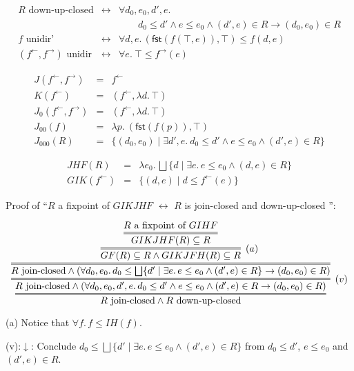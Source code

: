 \documentclass[9pt]{article}
\newcommand{\ff}{{f^{\rightarrow}}}
\newcommand{\fb}{{f^{\leftarrow}}}
\newcommand{\bigjoin}{\bigsqcup}
\newcommand{\con}{\wedge}
\newcommand{\imp}{\to}
\newcommand{\equ}{\leftrightarrow}
\newcommand{\fst}{\mathsf{fst}}
\begin{document}
 

\begin{eqnarray*}
  R \textrm{~down-up-closed}
  & \equ & \forall d_0,e_0,d',e.\, \\
  & & \qquad
        d_0 \leq d' \con e \leq e_0
           \con (d',e) \in R \imp (d_0,e_0) \in R \\
  f \textrm{~unidir'}
  & \equ & \forall d,e.\, (\fst(f(\top,e)),\top) \leq f(d,e) \\
  (\fb,\ff) \textrm{~unidir}
  & \equ & \forall e.\ \top \leq \ff(e)
\end{eqnarray*}           

\begin{eqnarray*}
  J(\fb,\ff)
  & = & \fb \\
  K(\fb)
  & = & (\fb, \lambda d.\, \top) \\  
  J_0(\fb,\ff)
  & = & (\fb, \lambda d.\, \top) \\
  J_{00}(f) 
  & = & \lambda p.\ (\fst(f(p)), \top) \\
  J_{000}(R)
  & = & \{ (d_0,e_0) \mid \exists d',e.\
          d_0 \leq d' \con e \leq e_0 \con (d',e) \in R \}
\end{eqnarray*}

\begin{eqnarray*}
 JHF(R) & = &
    \lambda e_0.\, \bigjoin\{d \mid \exists e.\, e \leq e_0 \con (d,e) \in R\} \\
 GIK(\fb) & = &
                    \{ (d,e) \mid d \leq \fb(e) \} 
\end{eqnarray*}

Proof of ``$R$ a fixpoint of $GIKJHF$ $\equ$ $R$ is join-closed and down-up-closed '':

\[
\infer={R \textrm{~join-closed} \con R \textrm{~down-up-closed}}{
  \infer=[(v)]{R \textrm{~join-closed} \con (\forall d_0,e_0,d',e.\, 
        d_0 \leq d' \con e \leq e_0 
           \con (d',e) \in R \imp (d_0,e_0) \in R)}{    
           \infer={R \textrm{~join-closed} \con (\forall d_0,e_0.\, d_0 \leq \bigjoin \{d' \mid \exists e.\, e \leq e_0 \con (d',e) \in R\}
                \imp (d_0,e_0) \in R)}{
        \infer=[(a)]{GF(R) \subseteq R \con GIKJFH(R) \subseteq R}{        
          \infer={GIKJHF(R) \subseteq R}{
            R \textrm{~a fixpoint of $GIHF$}
          }  
        }
     }  
  }
}  
\]

(a) Notice that $\forall f.\, f \leq IH(f)$. 

(v):$\downarrow$: Conclude
$d_0 \leq \bigjoin \{d' \mid \exists e.\, e \leq e_0 \con (d',e)
\in R\}$ from $d_0 \leq d'$, $e \leq e_0$ and $(d',e) \in R$.
\end{document}

